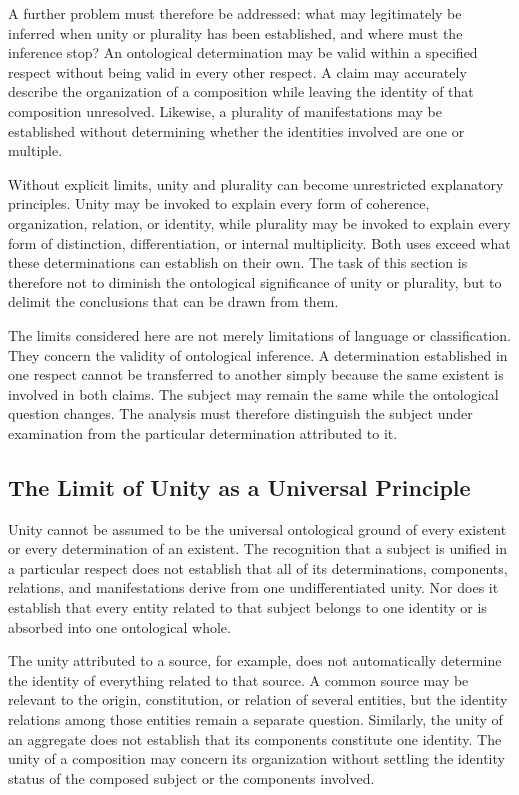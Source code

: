 A further problem must therefore be addressed: what may
legitimately be inferred when unity or plurality has been
established, and where must the inference stop? An
ontological determination may be valid within a specified
respect without being valid in every other respect. A
claim may accurately describe the organization of a
composition while leaving the identity of that composition
unresolved. Likewise, a plurality of manifestations may
be established without determining whether the identities
involved are one or multiple.

Without explicit limits, unity and plurality can become
unrestricted explanatory principles. Unity may be invoked
to explain every form of coherence, organization, relation,
or identity, while plurality may be invoked to explain
every form of distinction, differentiation, or internal
multiplicity. Both uses exceed what these determinations
can establish on their own. The task of this section is
therefore not to diminish the ontological significance
of unity or plurality, but to delimit the conclusions
that can be drawn from them.

The limits considered here are not merely limitations
of language or classification. They concern the validity
of ontological inference. A determination established
in one respect cannot be transferred to another simply
because the same existent is involved in both claims.
The subject may remain the same while the ontological
question changes. The analysis must therefore distinguish
the subject under examination from the particular
determination attributed to it.

\subsection{The Limit of Unity as a Universal Principle}

Unity cannot be assumed to be the universal ontological
ground of every existent or every determination of an
existent. The recognition that a subject is unified in
a particular respect does not establish that all of its
determinations, components, relations, and manifestations
derive from one undifferentiated unity. Nor does it
establish that every entity related to that subject
belongs to one identity or is absorbed into one ontological
whole.

The unity attributed to a source, for example, does not
automatically determine the identity of everything related
to that source. A common source may be relevant to the
origin, constitution, or relation of several entities,
but the identity relations among those entities remain
a separate question. Similarly, the unity of an aggregate
does not establish that its components constitute one
identity. The unity of a composition may concern its
organization without settling the identity status of
the composed subject or the components involved.

